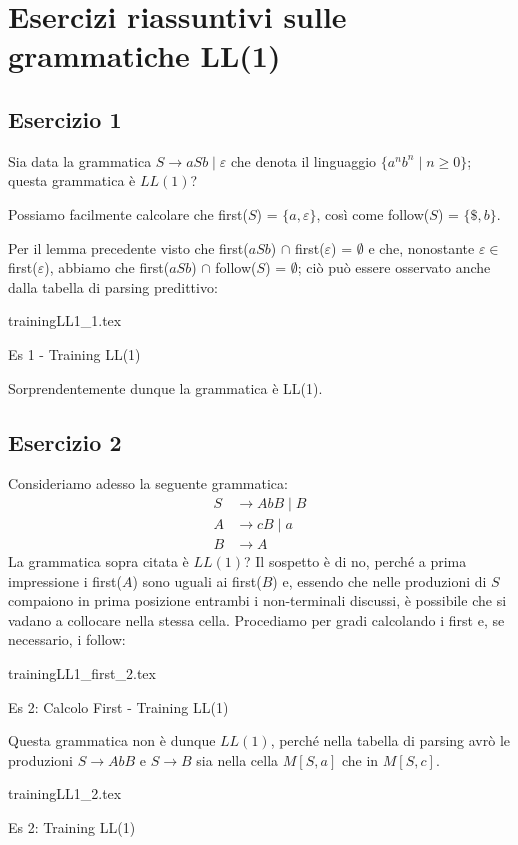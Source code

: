 \documentclass[class=book, crop=false, oneside, 12pt]{standalone}
\begin{document}
\section{Esercizi riassuntivi sulle grammatiche LL(1)}
\subsection*{Esercizio 1}
Sia data la grammatica \(S \rightarrow aSb \mid \varepsilon\) che denota il linguaggio \(\{a^n b^n \mid n \geq 0\}\); questa grammatica è \(LL(1)\)?

Possiamo facilmente calcolare che first(\(S\)) = \(\{a, \varepsilon\}\), così come follow(\(S\)) = \(\{\$, b\}\). 

Per il lemma precedente visto che first(\(aSb\)) \(\cap\) first(\(\varepsilon\)) = \(\emptyset\) e che, nonostante \(\varepsilon \in\) first(\(\varepsilon\)), abbiamo che first(\(aSb\)) \(\cap\) follow(\(S\)) = \(\emptyset\); ciò può essere osservato anche dalla tabella di parsing predittivo:
\begin{table}[H]
    \centering
    {trainingLL1_1.tex}
    \caption{Es 1 - Training LL(1)}
    \label{trainingLL1_1}
\end{table}
Sorprendentemente dunque la grammatica è LL(1).

\subsection*{Esercizio 2}
Consideriamo adesso la seguente grammatica:
\begin{align*}
    S &\rightarrow AbB \mid B \\
    A &\rightarrow cB \mid a \\
    B &\rightarrow A
\end{align*}
La grammatica sopra citata è \(LL(1)\)? Il sospetto è di no, perché a prima impressione i first(\(A\)) sono uguali ai first(\(B\)) e, essendo che nelle produzioni di \(S\) compaiono in prima posizione entrambi i non-terminali discussi, è possibile che si vadano a collocare nella stessa cella. Procediamo per gradi calcolando i first e, se necessario, i follow:
\begin{table}[H]
    \centering
    {trainingLL1_first_2.tex}
    \caption{Es 2: Calcolo First - Training LL(1)}
    \label{trainingLL1_first_2}
\end{table}
Questa grammatica non è dunque \(LL(1)\), perché nella tabella di parsing avrò le produzioni \(S \rightarrow AbB\) e \(S \rightarrow B\) sia nella cella \(M[S, a]\) che in \(M[S, c]\).
\begin{table}[H]
    \centering
    {trainingLL1_2.tex}
    \caption{Es 2: Training LL(1)}
    \label{trainingLL1_2}
\end{table}
\end{document}
